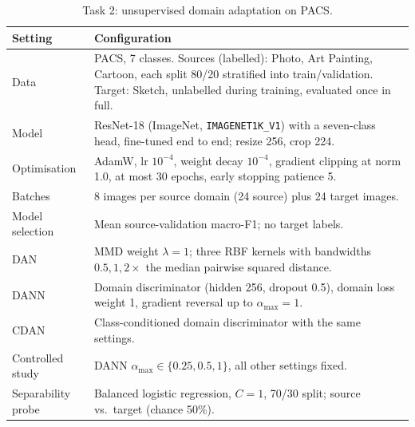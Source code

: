 \begin{table}[h]
  \caption{Task 2: unsupervised domain adaptation on PACS.}
  \label{tab:setup_task2}
  \centering
  \small
  \begin{tabular}{@{}p{}p{}@{}}
    \toprule
    \textbf{Setting} & \textbf{Configuration} \\
    \midrule
    Data & PACS, 7 classes. Sources (labelled): Photo, Art Painting, Cartoon, each split 80/20 stratified into train/validation. Target: Sketch, unlabelled during training, evaluated once in full. \\
    Model & ResNet-18 (ImageNet, \texttt{IMAGENET1K\_V1}) with a seven-class head, fine-tuned end to end; resize 256, crop 224. \\
    Optimisation & AdamW, lr $10^{-4}$, weight decay $10^{-4}$, gradient clipping at norm 1.0, at most 30 epochs, early stopping patience 5. \\
    Batches & 8 images per source domain (24 source) plus 24 target images. \\
    Model selection & Mean source-validation macro-F1; no target labels. \\
    DAN & MMD weight $\lambda=1$; three RBF kernels with bandwidths $0.5, 1, 2\times$ the median pairwise squared distance. \\
    DANN & Domain discriminator (hidden 256, dropout 0.5), domain loss weight 1, gradient reversal up to $\alpha_{\max}=1$. \\
    CDAN & Class-conditioned domain discriminator with the same settings. \\
    Controlled study & DANN $\alpha_{\max}\in\{0.25, 0.5, 1\}$, all other settings fixed. \\
    Separability probe & Balanced logistic regression, $C=1$, 70/30 split; source vs.\ target (chance 50\%). \\
    \bottomrule
  \end{tabular}
\end{table}

